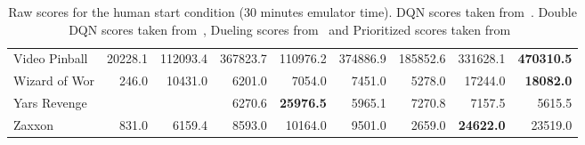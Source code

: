 \documentclass{article} \usepackage{times}
\begin{document}
\begin{table*}[h]
\begin{scriptsize}
\begin{tabular}{lrrrrrrrr}
Video Pinball & 20228.1 & 112093.4 & 367823.7 & 110976.2 & 374886.9 & 185852.6 & 331628.1 & \textbf{470310.5}\\
Wizard of Wor & 246.0 & 10431.0 & 6201.0 & 7054.0 & 7451.0 & 5278.0 & 17244.0 & \textbf{18082.0}\\
Yars Revenge &  &  & 6270.6 & \textbf{25976.5} & 5965.1 & 7270.8 & 7157.5 & 5615.5\\
Zaxxon & 831.0 & 6159.4 & 8593.0 & 10164.0 & 9501.0 & 2659.0 & \textbf{24622.0} & 23519.0\\
     \end{tabular}
    \end{scriptsize}
    \caption{\label{fig-atari-full} Raw scores for the human start condition (30 minutes emulator time). DQN scores taken from~\cite{nair2015gorila}. Double DQN scores taken from~\cite{hado2015doubledqn}, Dueling scores from~\cite{wang2015dueling} and Prioritized scores taken from~\cite{schaul2015prioritized}}
\end{table*}

 
\end{document}
